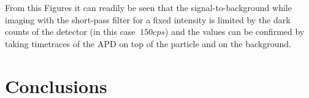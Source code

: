 \documentclass[twocolumn]{article}
\begin{document}

From this Figures it can readily be seen that the signal-to-background while
imaging with the short-pass filter for a fixed intensity is limited by
the dark counts of the detector (in this case $~150cps$) and the values can be
confirmed by taking timetraces of the APD on top of the particle and on the
background.





\section{Conclusions}
\end{document}
